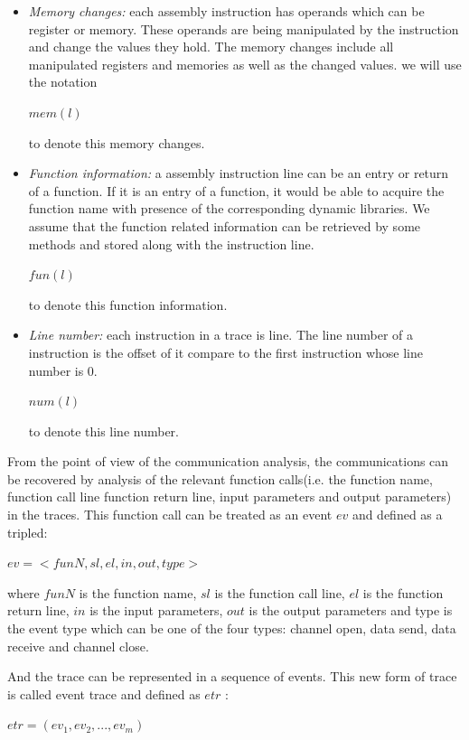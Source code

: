 \begin{itemize}
\item \textit{Memory changes:}  each assembly instruction has operands which can be register or memory. These operands are being manipulated by the instruction and change the values they hold. The memory changes include all manipulated registers and memories as well as the changed values. we will use the notation 

$mem(l)$ 

to denote this memory changes. 

\item \textit{Function information:} a assembly instruction line can be an entry or return of a function. If it is an entry of a function, it would be able to acquire the function name with presence of the corresponding dynamic libraries. We assume that the function related information can be retrieved by some methods and stored along with the instruction line.

$fun(l)$ 

to denote this function information. 

\item \textit{Line number:} each instruction in a trace is line. The line number of a instruction is the offset of it compare to the first instruction whose line number is 0.

$num(l)$ 

to denote this line number. 

\end{itemize}

From the point of view of the communication analysis, the communications can be recovered by analysis of the relevant function calls(i.e. the function name, function call line function return line, input parameters and output parameters) in the traces. This function call can be treated as an event $ev$ and defined as a tripled:

$ev = <funN, sl, el, in, out, type>$

where $funN$ is the function name, $sl$ is the function call line, $el$ is the function return line, $in$ is the input parameters, $out$ is the output parameters and type is the event type which can be one of the four types: channel open, data send, data receive and channel close.

And the trace can be represented in a sequence of events.  This new form of trace is called event trace and defined as $etr$ :

$etr = (ev_1, ev_2, ..., ev_m)$

